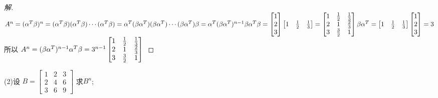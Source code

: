 \documentclass[10pt,a4paper]{report}
\begin{document}
\begin{proof}[解]
	$
	A^{n} = (\alpha^{T} \beta)^{n} = (\alpha^{T} \beta)(\alpha^{T} \beta)\cdots(\alpha^{T} \beta) = \alpha^{T} (\beta\alpha^{T})(\beta\alpha^{T})\cdots(\beta\alpha^{T}) \beta\\
	= \alpha^{T} (\beta\alpha^{T})^{n-1} \beta\\
	\alpha^{T} \beta = 
	\left[
	\begin{matrix}
	1 \\
	2 \\
	3
	\end{matrix}
	\right] 
	\left[
	\begin{matrix}
	1 & \frac{1}{2} & \frac{1}{3}
	\end{matrix}
	\right]=
	\left[
	\begin{matrix}
	1 & \frac{1}{2} & \frac{1}{3} \\
	2 & 1 & \frac{2}{3} \\
	3 & \frac{3}{2} & 1
	\end{matrix}
	\right] \\
	\beta \alpha^{T} = 
	\left[
	\begin{matrix}
	1 & \frac{1}{2} & \frac{1}{3}
	\end{matrix}
	\right]
	\left[
	\begin{matrix}
	1 \\
	2 \\
	3
	\end{matrix}
	\right] = 3
	$\\
	所以
	$
	A^{n} = (\beta\alpha^{T})^{n-1}\alpha^{T} \beta = 3^{n-1}\left[
	\begin{matrix}
	1 & \frac{1}{2} & \frac{1}{3} \\
	2 & 1 & \frac{2}{3} \\
	3 & \frac{3}{2} & 1
	\end{matrix}
	\right] \\
	$
\end{proof}
\noindent (2)设
$B = 
\left[
\begin{matrix}
1 & 2 & 3 \\
2 & 4 & 6 \\
3 & 6 & 9
\end{matrix}
\right] 
$
求$B^{n}$;
\end{document}
